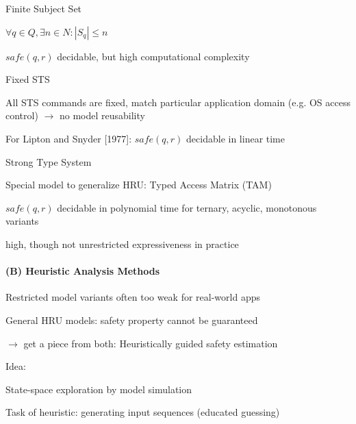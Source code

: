 \documentclass[a4paper]{article}
\begin{document}
\begin{multicols}{3}
    Finite Subject Set
    \begin{itemize*}
        \item $\forall q\in Q,\exists n\in N: |S_q|\leq n$
        \item $safe(q,r)$ decidable, but high computational complexity
    \end{itemize*}

    Fixed STS
    \begin{itemize*}
        \item All STS commands are fixed, match particular application domain (e.g. OS access control) $\rightarrow$ no model reusability
        \item For Lipton and Snyder [1977]: $safe(q,r)$ decidable in linear time
    \end{itemize*}

    Strong Type System
    \begin{itemize*}
        \item Special model to generalize HRU: Typed Access Matrix (TAM)
        \item $safe(q,r)$ decidable in polynomial time for ternary, acyclic, monotonous variants
        \item high, though not unrestricted expressiveness in practice
    \end{itemize*}

    \paragraph{(B) Heuristic Analysis Methods}
    \begin{itemize*}
        \item Restricted model variants often too weak for real-world apps
        \item General HRU models: safety property cannot be guaranteed
        \item[$\rightarrow$] get a piece from both: Heuristically guided safety estimation
    \end{itemize*}

    Idea:
    \begin{itemize*}
        \item State-space exploration by model simulation
        \item Task of heuristic: generating input sequences (educated guessing)
    \end{itemize*}


\end{multicols}
\end{document}
